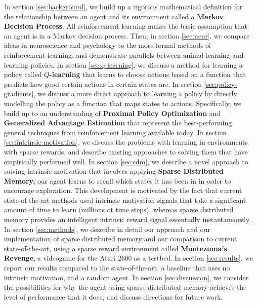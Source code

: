 \documentclass[journal, onecolumn, 12pt, draftclsnofoot]{IEEEtran}
\begin{document}
	\par In section \ref{sec:background}, we build up a rigorous mathematical definition for the relationship between an agent and its environment called a \textbf{Markov Decision Process}. All reinforcement learning makes the basic assumption that an agent is in a Markov decision process. Then, in section \ref{sec:neur}, we compare ideas in neuroscience and psychology to the more formal methods of reinforcement learning, and demonstrate parallels between animal learning and learning policies. In section \ref{sec:q-learning}, we discuss a method for learning a policy called \textbf{$Q$-learning} that learns to choose actions based on a function that predicts how good certain actions in certain states are. In section \ref{sec:policy-gradients}, we discuss a more direct approach to learning a policy by directly modelling the policy as a function that maps states to actions. Specifically, we build up to an understanding of \textbf{Proximal Policy Optimization} and \textbf{Generalized Advantage Estimation} that represent the best-performing general techniques from reinforcement learning available today. In section \ref{sec:intrinsic-motivation}, we discuss the problems with learning in environments with sparse rewards, and describe existing approaches to solving them that have empirically performed well. In section \ref{sec:sdm}, we describe a novel approach to solving intrinsic motivation that involves applying \textbf{Sparse Distributed Memory}; our agent learns to recall which states it has been in in order to encourage exploration. This development is motivated by the fact that current state-of-the-art methods used intrinsic motivation signals that take a significant amount of time to learn (millions ot time steps), whereas sparse distributed memory provides an intelligent intrinsic reward signal essentially instantaneously. In section \ref{sec:methods}, we describe in detail our approach and our implementation of sparse distributed memory and our comparison to current state-of-the-art, using a sparse reward environment called \textbf{Montezuma's Revenge}, a videogame for the Atari 2600 as a testbed. In section \ref{sec:results}, we report our results compared to the state-of-the-art, a baseline that uses no intrinsic motivation, and a random agent. In section \ref{sec:discussion}, we consider the possibilities for why the agent using sparse distributed memory achieves the level of performance that it does, and discuss directions for future work.

	\newpage
\end{document}
